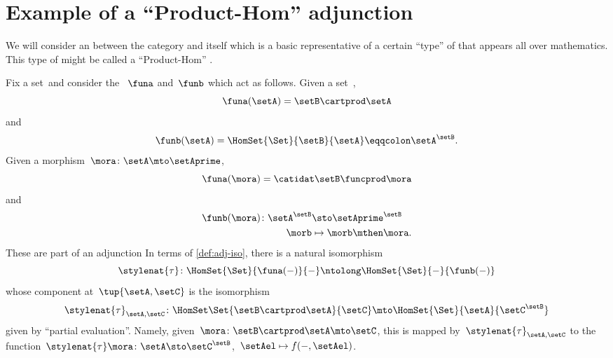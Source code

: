 
\section[Product-Hom adjunction]{Example of a ``Product-Hom'' adjunction}
We will consider an  between the category \Set and itself which is a basic representative of a certain ``type'' of  that appears all over mathematics.
This type of  might be called a ``Product-Hom'' .

Fix a set~\setB and consider the ~$\funa$ and~$\funb$ which act as follows.
Given a set~\setA,
\begin{equation}\label{eq:product-with-a-set-functor-objects}
    \funa(\setA) = \setB \cartprod \setA
\end{equation}
and
\begin{equation}\label{eq:set-expontiation-functor-objects}
    \funb(\setA) = \HomSet{\Set}{\setB}{\setA} \eqqcolon \setA^\setB.
\end{equation}
Given a morphism~$\mora\colon \setA \mto \setAprime$,
\begin{equation}\label{eq:product-with-a-set-functor-morphisms}
    \funa(\mora) = \catidat\setB \funcprod \mora
\end{equation}
and
\begin{equation}\label{eq:set-exponentiation-functor-morphisms}
    \begin{aligned}
        \funb(\mora)\colon \setA^\setB & \sto \setAprime^\setB \\
        \morb                          & \mapsto \morb \mthen \mora.
    \end{aligned}
\end{equation}
%
These  are part of an adjunction
%
%
In terms of \cref{def:adj-iso}, there is a natural isomorphism
\begin{equation}\label{eq:prod-hom-adjunction-transpose-nat-iso}
    \stylenat{\tau}\colon \HomSet{\Set}{\funa(- )}{-} \ntolong \HomSet{\Set}{-}{\funb( - )}
\end{equation}
whose component at~$\tup{\setA,\setC}$ is the isomorphism
\begin{equation}\label{eq:prod-hom-adjunction-transpose-components}
    \stylenat{\tau}_{\setA,\setC} \colon \HomSet\Set{\setB\cartprod \setA}{\setC} \mto \HomSet{\Set}{\setA}{\setC^\setB}
\end{equation}
given by ``partial evaluation''.
Namely, given~$\mora \colon \setB \cartprod \setA \mto \setC$, this is mapped by~$\stylenat{\tau}_{\setA,\setC}$ to the function~$\stylenat{\tau}\mora \colon \setA \sto \setC^\setB$,~$\setAel \mapsto f( -, \setAel)$.

